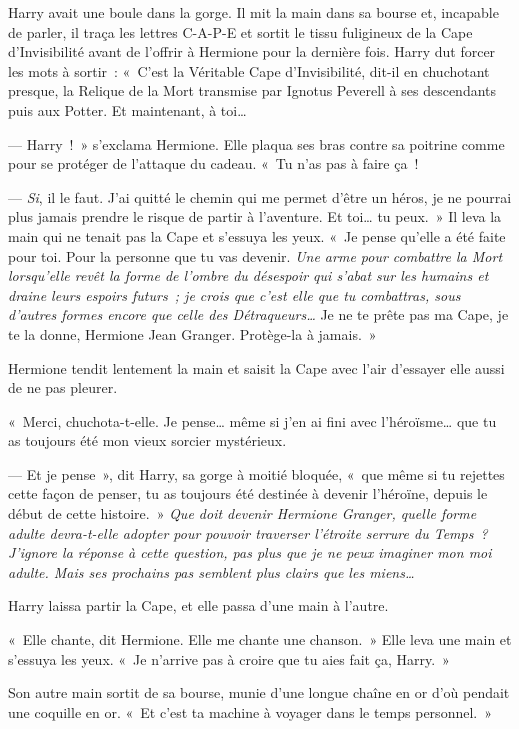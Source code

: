 Harry avait une boule dans la gorge.
Il mit la main dans sa bourse et, incapable de parler, il traça les lettres C-A-P-E et sortit le tissu fuligineux de la Cape d'Invisibilité avant de l'offrir à Hermione pour la dernière fois.
Harry dut forcer les mots à sortir~: «~C'est la Véritable Cape d'Invisibilité, dit-il en chuchotant presque, la Relique de la Mort transmise par Ignotus Peverell à ses descendants puis aux Potter.
Et maintenant, à toi…

--- Harry~!~»
s'exclama Hermione.
Elle plaqua ses bras contre sa poitrine comme pour se protéger de l'attaque du cadeau.
«~Tu n'as pas à faire ça~!

--- \emph{Si}, il le faut.
J'ai quitté le chemin qui me permet d'être un héros, je ne pourrai plus jamais prendre le risque de partir à l'aventure.
Et toi… tu peux.~»
Il leva la main qui ne tenait pas la Cape et s'essuya les yeux.
«~Je pense qu'elle a été faite pour toi.
Pour la personne que tu vas devenir.
\emph{Une arme pour combattre la Mort lorsqu'elle revêt la forme de l'ombre du désespoir qui s'abat sur les humains et draine leurs espoirs futurs~; je crois que c'est elle que tu combattras, sous d'autres formes encore que celle des Détraqueurs…} Je ne te prête pas ma Cape, je te la donne, Hermione Jean Granger.
Protège-la à jamais.~»

Hermione tendit lentement la main et saisit la Cape avec l'air d'essayer elle aussi de ne pas pleurer.

«~Merci, chuchota-t-elle.
Je pense… même si j'en ai fini avec l'héroïsme… que tu as toujours été mon vieux sorcier mystérieux.

--- Et je pense~», dit Harry, sa gorge à moitié bloquée, «~que même si tu rejettes cette façon de penser, tu as toujours été destinée à devenir l'héroïne, depuis le début de cette histoire.~»
\emph{Que doit devenir Hermione Granger, quelle forme adulte devra-t-elle adopter pour pouvoir traverser l'étroite serrure du Temps~?
J'ignore la réponse à cette question, pas plus que je ne peux imaginer mon moi adulte.
Mais ses prochains pas semblent plus clairs que les miens…}

Harry laissa partir la Cape, et elle passa d'une main à l'autre.

«~Elle chante, dit Hermione.
Elle me chante une chanson.~»
Elle leva une main et s'essuya les yeux.
«~Je n'arrive pas à croire que tu aies fait ça, Harry.~»

Son autre main sortit de sa bourse, munie d'une longue chaîne en or d'où pendait une coquille en or.
«~Et c'est ta machine à voyager dans le temps personnel.~»

